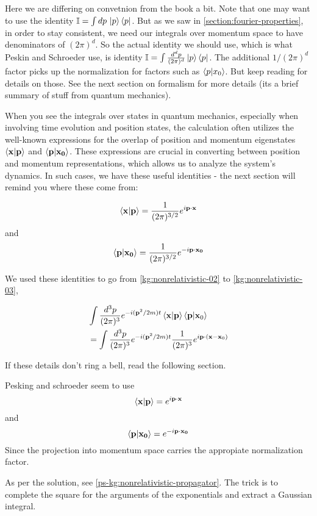Here we are differing on convetnion from the book a bit.
Note that one may want to use the identity $\mathbb{I} = \int dp\, \ket{p}\bra{p}$.
But as we saw in \ref{section:fourier-properties}, in order to stay consistent, we need our integrals over
momentum space to have denominators of $\left(2\pi\right)^d$.
So the actual identity we should use, which is what Peskin and Schroeder use, is identity
$\mathbb{I} = \int \frac{d^dp}{(2\pi)^d} \ket{p}\bra{p}$.
The additional $1/(2\pi)^d$ factor picks up the normalization for factors such as $\braket{p | x_0}$.
But keep reading for details on those.
See the next section on formalism for more details (its a brief summary of stuff from quantum mechanics).


When you see the integrals over states in quantum mechanics, especially when involving time evolution and position states,
the calculation often utilizes the well-known expressions for the overlap of position and momentum eigenstates
$\braket{\boldsymbol{\mathbf{x}} | \boldsymbol{\mathbf{p}}}$ and $\braket{\boldsymbol{\mathbf{p}} | \boldsymbol{\mathbf{x_0}}}$.
These expressions are crucial in converting between position and momentum representations,
which allows us to analyze the system's dynamics.
In such cases, we have these useful identities - the next section will remind you where these come from:

$$
\braket{\boldsymbol{\mathbf{x}} | \boldsymbol{\mathbf{p}}} = \frac{1}{(2\pi)^{3/2}} e^{i\boldsymbol{\mathbf{p}}\cdot\boldsymbol{\mathbf{x}}}
$$
and 
$$
\braket{\boldsymbol{\mathbf{p}} | \boldsymbol{\mathbf{x_0}}} = \frac{1}{(2\pi)^{3/2}} e^{-i\boldsymbol{\mathbf{p}}\cdot\boldsymbol{\mathbf{x_0}}}
$$

We used these identities to go from \ref{kg:nonrelativistic-02} to \ref{kg:nonrelativistic-03},

\begin{align*}
& \int \frac{d^3p}{(2\pi)^3} e^{-i(\boldsymbol{\mathbf{p}}^2/2m)t} \braket{\boldsymbol{\mathbf{x}} | \boldsymbol{\mathbf{p}}} \braket{\boldsymbol{\mathbf{p}} | \boldsymbol{\mathbf{x}}_0} \\
&= \int \frac{d^3p}{(2\pi)^3} e^{-i(\boldsymbol{\mathbf{p}}^2/2m)t} \frac{1}{(2\pi)^3} e^{i\boldsymbol{\mathbf{p}}\cdot(\boldsymbol{\mathbf{x}}-\boldsymbol{\mathbf{x}}_0)} 
\end{align*}

If these details don't ring a bell, read the following section.

Pesking and schroeder seem to use
$$
\braket{\boldsymbol{\mathbf{x}} | \boldsymbol{\mathbf{p}}} = e^{i\boldsymbol{\mathbf{p}}\cdot\boldsymbol{\mathbf{x}}}
$$
and 
$$
\braket{\boldsymbol{\mathbf{p}} | \boldsymbol{\mathbf{x_0}}} = e^{-i\boldsymbol{\mathbf{p}}\cdot\boldsymbol{\mathbf{x_0}}}
$$
Since the projection into momentum space carries the appropiate normalization factor.


As per the solution, see \ref{ps-kg:nonrelativistic-propagator}.
The trick is to complete the square for the arguments of the exponentials and extract a Gaussian integral.


